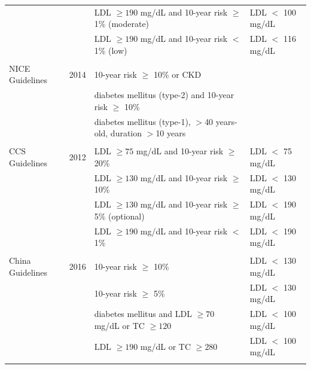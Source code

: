 \documentclass[12pt]{article}
\begin{document}
\begin{appendix}
\begin{landscape}
\begin{table}[H]
{\begin{threeparttable}
\begin{tabular}{llll}
            & & LDL $\geq 190$ mg/dL and 10-year risk\tnote{\textdagger} \hspace{1pt}  $\geq$ 1\% (moderate) & LDL $<$ 100 mg/dL \\
            & & LDL $\geq 190$ mg/dL and 10-year risk\tnote{\textdagger} \hspace{1pt} $<$ 1\% (low) & LDL $<$ 116 mg/dL \\
            & & & \\
            NICE Guidelines \cite{rabar_lipid_2014} & 2014 & 10-year risk\tnote{\ddag} \hspace{1pt} $\geq$ 10\% or CKD &  \\
            & & diabetes mellitus (type-2) and 10-year risk\tnote{\ddag} \hspace{1pt} $\geq$ 10\% &  \\
            & & diabetes mellitus (type-1), $>$40 years-old, duration $>$10 years &  \\
            & & & \\
            CCS Guidelines \cite{anderson_2012_2013} & 2012 & LDL $\geq 75$ mg/dL and 10-year risk\tnote{\S} \hspace{1pt} $\geq$ 20\% & LDL $<$ 75 mg/dL \\
            & & LDL $\geq 130$ mg/dL and 10-year risk\tnote{\S} \hspace{1pt}  $\geq$ 10\% & LDL $<$ 130 mg/dL \\
            & & LDL $\geq 130$ mg/dL and 10-year risk\tnote{\S} \hspace{1pt}  $\geq$ 5\% (optional) & LDL $<$ 190 mg/dL \\
            & & LDL $\geq 190$ mg/dL and 10-year risk\tnote{\S} \hspace{1pt} $<$ 1\% & LDL $<$ 190 mg/dL \\
            & & & \\
            China Guidelines \cite{anderson_2012_2013} & 2016 & 10-year risk\tnote{$||$} \hspace{1pt} $\geq$ 10\% & LDL $<$ 130 mg/dL \\
            & & 10-year risk\tnote{$||$} \hspace{1pt} $\geq$ 5\% & LDL $<$ 130 mg/dL \\
            & & diabetes mellitus and LDL $\geq 70$ mg/dL or TC $\geq 120$ & LDL $<$ 100 mg/dL \\
            & & LDL $\geq 190$ mg/dL or TC $\geq 280$ & LDL $<$ 100 mg/dL \\
            & & & \\

\end{tabular}
\end{threeparttable}}
\end{table}
\end{landscape}
\end{appendix}
\end{document}
